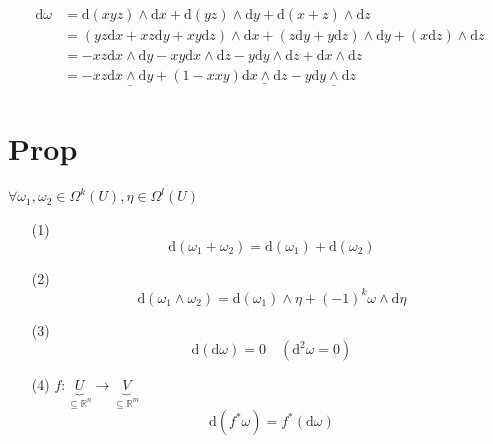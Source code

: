 \documentclass{book}
\begin{document}
$$
\begin{aligned}
    \text{d}\omega &=\text{d}(xyz)\wedge\text{d}x+\text{d}(yz)\wedge\text{d}y+\text{d}(x+z)\wedge\text{d}z\\
    &=(yz\text{d}x+xz\text{d}y+xy\text{d}z)\wedge\text{d}x+(z\text{d}y+y\text{d}z)\wedge\text{d}y+(x\text{d}z)\wedge\text{d}z\\
    &=-xz\text{d}x\wedge\text{d}y-xy\text{d}x\wedge\text{d}z-y\text{d}y\wedge\text{d}z+\text{d}x\wedge\text{d}z\\
    &=-xz\underline{\text{d}x\wedge\text{d}y}+(1-xxy)\underline{\text{d}x\wedge\text{d}z}-y\underline{\text{d}y\wedge\text{d}z}
\end{aligned}
$$
\section{Prop}$\forall \omega_1,\omega_2\in \Omega^k(U),\eta\in \Omega^l(U)$
\begin{itemize}
    \item [(1)]
    $$\text{d}(\omega_1+\omega_2)=\text{d}(\omega_1)+\text{d}(\omega_2)$$
    \item [(2)]
    $$\text{d}(\omega_1\wedge\omega_2)=\text{d}(\omega_1)\wedge\eta+(-1)^k\omega\wedge\text{d}\eta$$
    \item [(3)]
    $$\text{d}(\text{d}\omega)=0\quad(\text{d}^2\omega=0)$$
    \item [(4)]$f:\underbrace{U}\limits_{\subseteq \mathbb{R}^n}\rightarrow \underbrace{V}\limits_{\subseteq \mathbb{R}^m}$
    $$\text{d}(f^*\omega)=f^*(\text{d}\omega)$$
\end{itemize}
\end{document}
